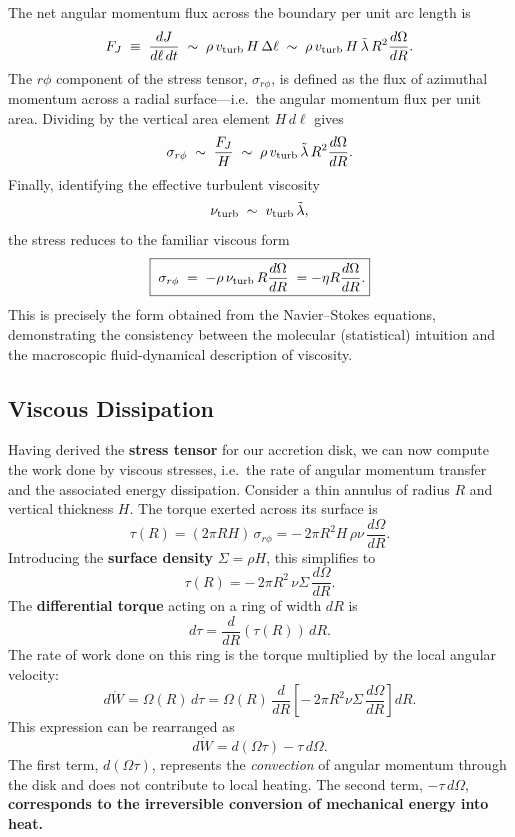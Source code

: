 The net angular momentum flux across the boundary per unit arc length is
\[
F_J \;\equiv\; \frac{dJ}{d\ell\,dt}
   \;\sim\; \rho \, v_{\rm turb}\, H \, \Delta \ell
   \;\sim\; \rho \, v_{\rm turb}\, H \,\tilde{\lambda} \, R^2 \frac{d\Omega}{dR}.
\]
The $r\phi$ component of the stress tensor, $\sigma_{r\phi}$, is defined as the flux of azimuthal momentum across a radial surface—i.e.\ the angular momentum flux per unit area. Dividing by the vertical area element $H\,d\ell$ gives
\[
\sigma_{r\phi} \;\sim\; \frac{F_J}{H}
   \;\sim\; \rho \, v_{\rm turb}\,\tilde{\lambda}\, R^2 \frac{d\Omega}{dR}.
\]
Finally, identifying the effective turbulent viscosity
\[
\nu_{\rm turb} \;\sim\; v_{\rm turb}\,\tilde{\lambda} ,
\]
the stress reduces to the familiar viscous form
\[
\boxed{\;\sigma_{r\phi} \;=\; - \rho \,\nu_{\rm turb}\, R \frac{d\Omega}{dR}\; = -\eta R\frac{d\Omega}{dR}.}
\]
This is precisely the form obtained from the Navier--Stokes equations, demonstrating the consistency between the molecular (statistical) intuition and the macroscopic fluid-dynamical description of viscosity.

\subsection{Viscous Dissipation}

Having derived the \textbf{stress tensor} for our accretion disk, we can now compute 
the work done by viscous stresses, i.e.\ the rate of angular momentum transfer and 
the associated energy dissipation. Consider a thin annulus of radius $R$ and vertical thickness $H$.  
The torque exerted across its surface is
\begin{equation}
\tau(R) = (2\pi R H)\,\sigma_{r\phi}
        = -\,2\pi R^2 H \,\rho \nu \,\frac{d\Omega}{dR}.
\end{equation}
Introducing the \textbf{surface density} $\Sigma = \rho H$, this simplifies to
\begin{equation}
\label{eq:disc_torque}
\tau(R) = -\,2\pi R^2 \,\nu \Sigma \,\frac{d\Omega}{dR}.
\end{equation}
The \textbf{differential torque} acting on a ring of width $dR$ is
\begin{equation}
d\tau = \frac{d}{dR}\!\left(\tau(R)\right)\, dR.
\end{equation}
The rate of work done on this ring is the torque multiplied by the
local angular velocity:
\begin{equation}
d\dot{W} = \Omega(R)\, d\tau
          = \Omega(R)\,\frac{d}{dR}\!\left[-\,2\pi R^2 \nu \Sigma \,\frac{d\Omega}{dR}\right] dR.
\end{equation}
This expression can be rearranged as
\begin{equation}
d\dot{W} = d(\Omega \tau) - \tau\, d\Omega.
\end{equation}
The first term, $d(\Omega \tau)$, represents the \emph{convection} of angular momentum 
through the disk and does not contribute to local heating.  The second term, $-\tau\,d\Omega$, \textbf{corresponds to the irreversible conversion of mechanical energy into heat.}

